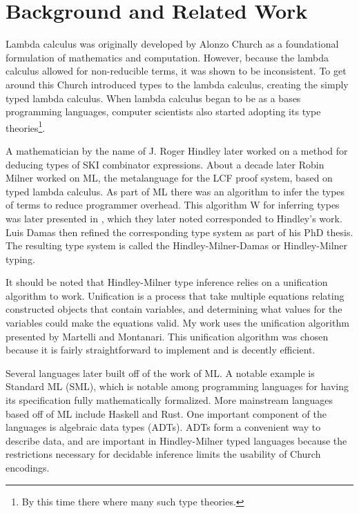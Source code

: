 \documentclass[12pt]{article}
\begin{document}
\section{Background and Related Work}


Lambda calculus was originally developed by Alonzo Church as a
foundational formulation of mathematics and computation.
However, because the lambda calculus allowed for non-reducible
terms, it was shown to be inconsistent.
To get around this Church introduced types to the lambda calculus,
creating the simply typed lambda calculus\cite{Church1940AFO}.
When lambda calculus began to be as a bases programming languages,
computer scientists also started adopting its type
theories\footnote{By this time there where many such type theories.}.

A mathematician by the name of J. Roger Hindley later worked on a
method for deducing types of SKI combinator
expressions\cite{Hindley1969}.
About a decade later Robin Milner worked on ML, the metalanguage for
the LCF proof system, based on typed lambda calculus.
As part of ML there was an algorithm to infer the types of terms to
reduce programmer overhead.
This algorithm W for inferring types was later presented in
\cite{MILNER1978}, which they later noted corresponded to Hindley's
work.
Luis Damas then refined the corresponding type system as part of his
PhD thesis\cite{Damas1982,Damas1984}.
The resulting type system is called the Hindley-Milner-Damas or
Hindley-Milner typing.

It should be noted that Hindley-Milner type inference relies on a
unification algorithm to work.
Unification is a process that take multiple equations relating
constructed objects that contain variables, and determining what
values for the variables could make the equations valid.
My work uses the unification algorithm presented by Martelli and
Montanari\cite{Martelli1982}.
This unification algorithm was chosen because it is fairly
straightforward to implement and is decently efficient.

Several languages later built off of the work of ML.
A notable example is Standard ML (SML)\cite{Milner1997TheDO}, which is
notable among programming languages for having its specification fully
mathematically formalized.
More mainstream languages based off of ML include
Haskell\cite{Marlow2010Haskell2L} and Rust.
One important component of the languages is algebraic data types
(ADTs).
ADTs form a convenient way to describe data, and are important in
Hindley-Milner typed languages because the restrictions necessary for
decidable inference limits the usability of Church encodings.
\end{document}

